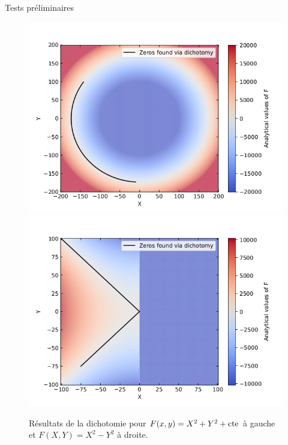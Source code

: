 \documentclass{beamer}
\begin{document}
\begin{frame}{Tests préliminaires}
    \begin{figure}
        \centering
        \includegraphics[width=0.49\linewidth]{Circle_dicho.png}%
        \includegraphics[width=0.49\linewidth]{DiffSquares_dicho.png}
        \caption{Résultats de la dichotomie pour $F(x,y) = X^2 +  Y^2 + \rm{cte}$ à gauche et $F(X,Y) = X^2 - Y^2$ à droite.}
        \label{Circle_dicho.png}
    \end{figure}
\end{frame}
\end{document}
